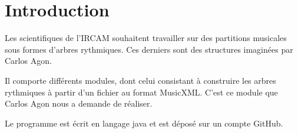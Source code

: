 \section{Introduction}

Les scientifiques de l'IRCAM souhaitent travailler sur des partitions musicales sous formes d'arbres rythmiques. Ces derniers sont des structures imaginées par Carlos Agon.

\par
Il comporte différents modules, dont celui consistant à construire les arbres rythmiques à partir d'un fichier au format MusicXML. C'est ce module que Carlos Agon nous a demande de réaliser.

\par
Le programme est écrit en langage java et est déposé sur un compte GitHub.